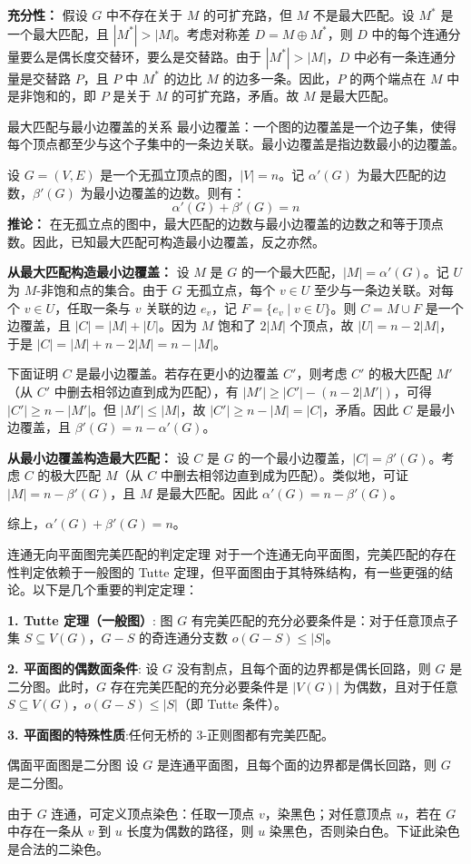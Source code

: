 \textbf{充分性：} 假设 $G$ 中不存在关于 $M$ 的可扩充路，但 $M$ 不是最大匹配。设 $M^*$ 是一个最大匹配，且 $|M^*| > |M|$。考虑对称差 $D = M \oplus M^*$，则 $D$ 中的每个连通分量要么是偶长度交替环，要么是交替路。由于 $|M^*| > |M|$，$D$ 中必有一条连通分量是交替路 $P$，且 $P$ 中 $M^*$ 的边比 $M$ 的边多一条。因此，$P$ 的两个端点在 $M$ 中是非饱和的，即 $P$ 是关于 $M$ 的可扩充路，矛盾。故 $M$ 是最大匹配。
\begin{theorem}{最大匹配与最小边覆盖的关系}{}
最小边覆盖：一个图的边覆盖是一个边子集，使得每个顶点都至少与这个子集中的一条边关联。最小边覆盖是指边数最小的边覆盖。

设 $G=(V,E)$ 是一个无孤立顶点的图，$|V|=n$。记 $\alpha'(G)$ 为最大匹配的边数，$\beta'(G)$ 为最小边覆盖的边数。则有：
\[
\alpha'(G) + \beta'(G) = n
\]
\textbf{推论：}
在无孤立点的图中，最大匹配的边数与最小边覆盖的边数之和等于顶点数。因此，已知最大匹配可构造最小边覆盖，反之亦然。
\end{theorem}
\textbf{从最大匹配构造最小边覆盖：}
设 $M$ 是 $G$ 的一个最大匹配，$|M| = \alpha'(G)$。记 $U$ 为 $M$-非饱和点的集合。由于 $G$ 无孤立点，每个 $v \in U$ 至少与一条边关联。对每个 $v \in U$，任取一条与 $v$ 关联的边 $e_v$，记 $F = \{ e_v \mid v \in U \}$。则 $C = M \cup F$ 是一个边覆盖，且 $|C| = |M| + |U|$。因为 $M$ 饱和了 $2|M|$ 个顶点，故 $|U| = n - 2|M|$，于是 $|C| = |M| + n - 2|M| = n - |M|$。

下面证明 $C$ 是最小边覆盖。若存在更小的边覆盖 $C'$，则考虑 $C'$ 的极大匹配 $M'$（从 $C'$ 中删去相邻边直到成为匹配），有 $|M'| \ge |C'| - (n - 2|M'|)$，可得 $|C'| \ge n - |M'|$。但 $|M'| \le |M|$，故 $|C'| \ge n - |M| = |C|$，矛盾。因此 $C$ 是最小边覆盖，且 $\beta'(G) = n - \alpha'(G)$。

 \textbf{从最小边覆盖构造最大匹配：}
设 $C$ 是 $G$ 的一个最小边覆盖，$|C| = \beta'(G)$。考虑 $C$ 的极大匹配 $M$（从 $C$ 中删去相邻边直到成为匹配）。类似地，可证 $|M| = n - \beta'(G)$，且 $M$ 是最大匹配。因此 $\alpha'(G) = n - \beta'(G)$。

综上，$\alpha'(G) + \beta'(G) = n$。

\begin{theorem}{连通无向平面图完美匹配的判定定理}{}
    对于一个连通无向平面图，完美匹配的存在性判定依赖于一般图的 Tutte 定理，但平面图由于其特殊结构，有一些更强的结论。以下是几个重要的判定定理：

    \textbf{1. Tutte 定理（一般图）}:
    图 $G$ 有完美匹配的充分必要条件是：对于任意顶点子集 $S \subseteq V(G)$，$G-S$ 的奇连通分支数 $o(G-S) \le |S|$。

    \textbf{2. 平面图的偶数面条件}:
    设 $G$ 没有割点，且每个面的边界都是偶长回路，则 $G$ 是二分图。此时，$G$ 存在完美匹配的充分必要条件是 $|V(G)|$ 为偶数，且对于任意 $S \subseteq V(G)$，$o(G-S) \le |S|$（即 Tutte 条件）。

    \textbf{3. 平面图的特殊性质}:任何无桥的 3-正则图都有完美匹配。
\end{theorem}
\begin{theorem}{偶面平面图是二分图}{}
    设 $G$ 是连通平面图，且每个面的边界都是偶长回路，则 $G$ 是二分图。
\end{theorem}
    由于 $G$ 连通，可定义顶点染色：任取一顶点 $v$，染黑色；对任意顶点 $u$，若在 $G$ 中存在一条从 $v$ 到 $u$ 长度为偶数的路径，则 $u$ 染黑色，否则染白色。下证此染色是合法的二染色。

